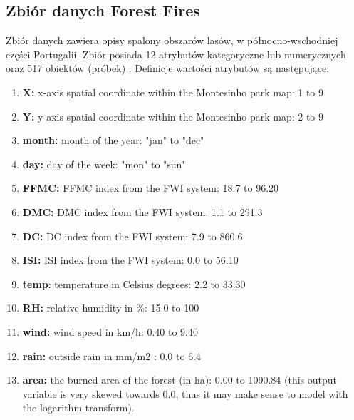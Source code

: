 \documentclass[10pt,a4paper]{article}
\begin{document}
\subsection{Zbiór danych Forest Fires}
Zbiór danych zawiera opisy spalony obszarów lasów, w północno-wschodniej części Portugalii. Zbiór posiada 12 atrybutów kategoryczne lub numerycznych oraz 517 obiektów (próbek) \cite{ForestFiresDS}. Definicje wartości atrybutów są następujące:
\begin{enumerate}
	\item \textbf{X:} x-axis spatial coordinate within the Montesinho park map: 1 to 9
	\item \textbf{Y:} y-axis spatial coordinate within the Montesinho park map: 2 to 9
	\item \textbf{month:} month of the year: "jan" to "dec" 
	\item \textbf{day:} day of the week: "mon" to "sun"
	\item \textbf{FFMC:} FFMC index from the FWI system: 18.7 to 96.20
	\item \textbf{DMC:} DMC index from the FWI system: 1.1 to 291.3 
	\item \textbf{DC:} DC index from the FWI system: 7.9 to 860.6 
	\item \textbf{ISI:} ISI index from the FWI system: 0.0 to 56.10
	\item \textbf{temp}: temperature in Celsius degrees: 2.2 to 33.30
	\item \textbf{RH:} relative humidity in \%: 15.0 to 100
	\item \textbf{wind:} wind speed in km/h: 0.40 to 9.40 
	\item \textbf{rain:} outside rain in mm/m2 : 0.0 to 6.4 
	\item \textbf{area:} the burned area of the forest (in ha): 0.00 to 1090.84 
(this output variable is very skewed towards 0.0, thus it may make sense to model with the logarithm transform).  
\end{enumerate}
\end{document}
